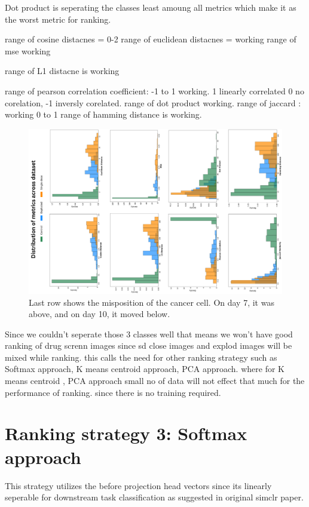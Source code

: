 Dot product is seperating the classes least amoung all metrics which make it as the worst metric for ranking.


range of cosine distacnes = 0-2
range of euclidean distacnes = working
range of mse working

range of L1 distacne is working

range of pearson correlation coefficient: -1 to 1 working. 1 linearly correlated 0 no corelation, -1 inversly corelated.
range of dot product  working.
range of jaccard : working 0 to 1
range of hamming distance is working.


\begin{figure}[H]
  \centering
  \includegraphics[scale=0.5, angle=270]{figures/predall.pdf} 
  \caption{Last row shows the misposition of the cancer cell. On day 7, it was above, and on day 10, it moved below.}
  \label{fig:bargraph}
\end{figure}


Since we couldn't seperate those 3 classes well that means we won't have good ranking of drug screnn images since sd close images and explod images will be mixed while ranking. this calls the need for other ranking strategy such as Softmax approach, K means centroid approach, PCA approach. where for K means centroid , PCA approach small no of data will not effect that much for the performance of ranking. since there is no training required.

\section{Ranking strategy 3: Softmax approach}

This strategy utilizes the before projection head vectors since its linearly seperable for downstream task classification as suggested in original simclr paper.

